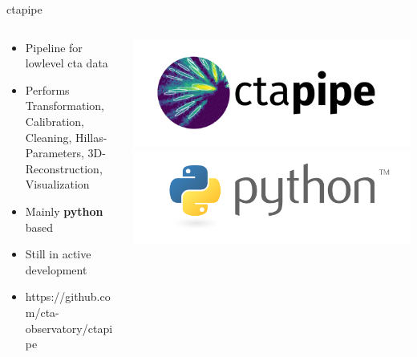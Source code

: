 \begin{frame}{ctapipe}
    \begin{columns}[T] %
        \begin{column}{.45\textwidth}
            \vspace{10pt}
            \begin{itemize}
                \item { Pipeline for lowlevel cta data}
                \item { Performs Transformation, Calibration, Cleaning,
                        Hillas-Parameters, 3D-Reconstruction, Visualization}
                \item { Mainly \textbf{python} based}
                \item { Still in active development}
                \item { https://github.com/cta-observatory/ctapipe}
            \end{itemize}
        \end{column}
        \begin{column}{.48\textwidth}
            \includegraphics[width=\linewidth]{images/ctapipe_logo.png}
            \includegraphics[width=\linewidth]{images/python_logo.png}
        \end{column}
    \end{columns}
\end{frame}
